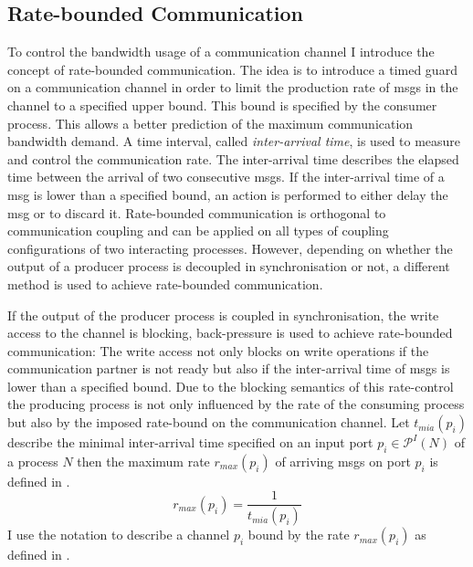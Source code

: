 \subsection{Rate-bounded Communication}
\label{sect_cci_decoupling_rate}
To control the bandwidth usage of a communication channel I introduce the concept of rate-bounded communication.
The idea is to introduce a timed guard on a communication channel in order to limit the production rate of \glspl*{msg} in the channel to a specified upper bound.
This bound is specified by the consumer process.
This allows a better prediction of the maximum communication bandwidth demand.
A time interval, called \emph{inter-arrival time}, is used to measure and control the communication rate.
The inter-arrival time describes the elapsed time between the arrival of two consecutive \glspl*{msg}.
If the inter-arrival time of a \gls*{msg} is lower than a specified bound, an action is performed to either delay the \gls*{msg} or to discard it.
Rate-bounded communication is orthogonal to communication coupling and can be applied on all types of coupling configurations of two interacting processes.
However, depending on whether the output of a producer process is decoupled in synchronisation or not, a different method is used to achieve rate-bounded communication.

If the output of the producer process is coupled in synchronisation, \ie the write access to the channel is blocking, back-pressure is used to achieve rate-bounded communication:
The write access not only blocks on write operations if the communication partner is not ready but also if the inter-arrival time of \glspl*{msg} is lower than a specified bound.
Due to the blocking semantics of this rate-control the producing process is not only influenced by the rate of the consuming process but also by the imposed rate-bound on the communication channel.
Let $t_{mia}(p_i)$ describe the minimal inter-arrival time specified on an input port $p_i \in \mathcal{P}^I(N)$ of a process $N$ then the maximum rate $r_{max}(p_i)$ of arriving \glspl*{msg} on port $p_i$ is defined in \Equ{\ref{eq_rate_max}}.
\begin{equation}
    \label{eq_rate_max}
    r_{max}(p_i) = \frac{1}{t_{mia}(p_i)}
\end{equation}
I use the notation  to describe a channel $p_i$ bound by the rate $r_{max}(p_i)$ as defined in \Equ{\ref{eq_rate_max}}.

